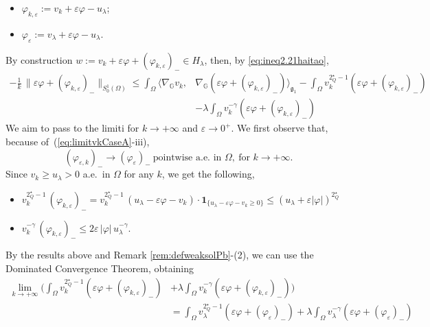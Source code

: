 \documentclass[11pt]{amsart}
\numberwithin{equation}{section} %
\theoremstyle{definition}
\def\G{\mathbb{G}}
\newcommand{\m}{\mbox}
\begin{document}
\begin{itemize}
	\item $\varphi_{k,\varepsilon}:=v_k+\varepsilon\varphi-u_\lambda$;
	\item $\varphi_{\varepsilon}:=v_\lambda+\varepsilon\varphi-u_\lambda$.
\end{itemize}
By construction $w:=v_k+\varepsilon\varphi+(\varphi_{k,\varepsilon})_-\in H_\lambda$, 
then, by \eqref{eq:ineq2.21haitao},
\begin{equation}\label{eq:ineq2.22haitao}
	\begin{split}
-\frac{1}{k}\, \|\varepsilon\varphi+(\varphi_{k,\varepsilon})_-\|_{S^1_0(\Omega)}\leq \int_\Omega\langle \nabla_\G v_k,&\nabla_\G(\varepsilon\varphi+(\varphi_{k,\varepsilon})_-)\rangle_{\mathfrak{g}_{1}}
-\int_\Omega v_k^{2^\star_Q-1}(\varepsilon\varphi+(\varphi_{k,\varepsilon})_-)\\
&-\lambda\int_\Omega v_k^{-\gamma}(\varepsilon\varphi+(\varphi_{k,\varepsilon})_-)
\end{split}
\end{equation}
We aim to pass to the limiti for $k\to+\infty$ and $\varepsilon\to0^+$.
We first observe that, because of~(\ref{eq:limitvkCaseA}-iii),
\[
(\varphi_{\varepsilon,k})_-\to(\varphi_\varepsilon)_-\ \m{pointwise a.e.~in }\Omega,\ \m{for }k\to+\infty.
\]
Since $v_k\geq u_\lambda>0$ a.e.~in $\Omega$ for any $k$, we get the following,
\begin{itemize}
	\vspace{7pt}
	\item $v_k^{2^\star_Q-1}\, (\varphi_{k,\varepsilon})_-=v_k^{2^\star_Q-1}\, (u_\lambda-\varepsilon\varphi-v_k)\cdot \mathbf{1}_{\{u_\lambda-\varepsilon\varphi-v_k\geq0\}}
		\leq(u_\lambda+\varepsilon|\varphi|)^{2^\star_Q}$
		\vspace{7pt}
		\item $v_k^{-\gamma}\, (\varphi_{k,\varepsilon})_-\leq 2\varepsilon \, |\varphi|\, u_\lambda^{-\gamma}$.
		\end{itemize}
By the results above and Remark	\ref{rem:defweaksolPb}-(2), we can use the Dominated
Convergence Theorem, obtaining
\begin{equation}\label{eq:gather1}
	\begin{split}
	\lim_{k\to+\infty}\biggl(\int_\Omega v_k^{2^\star_Q-1}(\varepsilon\varphi+(\varphi_{k,\varepsilon})_-)
	&+\lambda\int_\Omega v_k^{-\gamma}(\varepsilon\varphi+(\varphi_{k,\varepsilon})_-)\biggl)\\
	&=\int_\Omega v_\lambda^{2^\star_Q-1}(\varepsilon\varphi+(\varphi_\varepsilon)_-)+
	\lambda\int_\Omega v_\lambda^{-\gamma}(\varepsilon\varphi+(\varphi_\varepsilon)_-)
	\end{split}
\end{equation}
\end{document}
